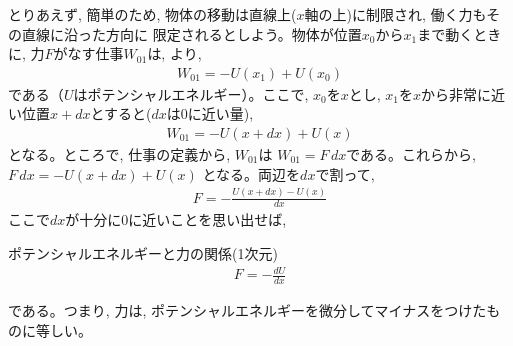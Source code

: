 とりあえず, 簡単のため, 物体の移動は直線上($x軸$の上)に制限され, 働く力もその直線に沿った方向に
限定されるとしよう。物体が位置$x_0$から$x_1$まで動くときに, 力$F$がなす仕事$W_{01}$は, 
より, 
\begin{eqnarray}
W_{01}=-U(x_1)+U(x_0)
\end{eqnarray}
である（$U$はポテンシャルエネルギー）。ここで, $x_0$を$x$とし, $x_1$を$x$から非常に近い位置$x+dx$とすると($dx$は0に近い量), 
\begin{eqnarray}
W_{01}=-U(x+dx)+U(x)\label{eq:W01UxdxUx}
\end{eqnarray}
となる。ところで, 仕事の定義から, $W_{01}$は
$W_{01}=F\,dx$である。これらから, 
$F\,dx=-U(x+dx)+U(x)$
となる。両辺を$dx$で割って, 
\begin{eqnarray}
F=-\frac{U(x+dx)-U(x)}{dx}
\end{eqnarray}
ここで$dx$が十分に0に近いことを思い出せば, 
\begin{itembox}{ポテンシャルエネルギーと力の関係(1次元)}
\begin{eqnarray}
F=-\frac{dU}{dx}
\end{eqnarray}
\end{itembox}
である。つまり, 力は, ポテンシャルエネルギーを微分してマイナスをつけたものに等しい。\mv

